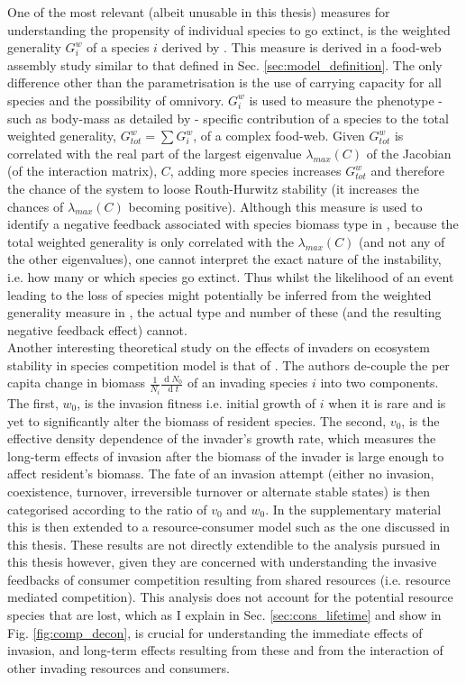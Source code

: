 \documentclass[a4paper]{report}
\DeclareMathOperator{\d}{d}
\begin{document}
 One of the most relevant (albeit unusable in this thesis) measures for understanding the propensity of individual species to go extinct, is the weighted generality $G^w_i$ of a species $i$ derived by \citep{Pawar2009}. This measure is derived in a food-web assembly study similar to that defined in Sec. \ref{sec:model_definition}. The only difference other than the parametrisation is the use of carrying capacity for all species and the possibility of omnivory. $G^w_i$ is used to measure the phenotype - such as body-mass as detailed by \citep{Pawar2015} - specific contribution of a species to the total weighted generality, $G^w_{tot}=\sum G^w_i$, of a complex food-web. Given $G^w_{tot}$ is correlated with the real part of the largest eigenvalue $\lambda_{max}(C)$ of the Jacobian (of the interaction matrix), $C$, adding more species increases $G^w_{tot}$ and therefore the chance of the system to loose Routh-Hurwitz stability (it increases the chances of $\lambda_{max}(C)$ becoming positive). Although this measure is used to identify a negative feedback associated with species biomass type in \citep{Pawar2015}, because the total weighted generality is only correlated with the $\lambda_{max}(C)$ (and not any of the other eigenvalues), one cannot interpret the exact nature of the instability, i.e. how many or which species go extinct. Thus whilst the likelihood of an event leading to the loss of species might potentially be inferred from the weighted generality measure in \citep{Pawar2009}, the actual type and number of these (and the resulting negative feedback effect) cannot. \\
 
 Another interesting theoretical study on the effects of invaders on ecosystem stability in species competition model is that of \citep{Barbier2019}. The authors de-couple the per capita change in biomass $\frac{1}{N_i}\frac{\d N_0}{\d t}$ of an invading species $i$ into two components. The first, $w_0$, is the invasion fitness i.e. initial growth of $i$ when it is rare and is yet to significantly alter the biomass of resident species. The second, $v_0$, is the effective density dependence of the invader’s growth rate, which measures the long-term effects of invasion after the biomass of the invader is large enough to affect resident's biomass. The fate of an invasion attempt (either no invasion, coexistence, turnover, irreversible turnover or alternate stable states) is then categorised according to the ratio of $v_0$ and $w_0$. In the supplementary material this is then extended to a resource-consumer model such as the one discussed in this thesis. These results are not directly extendible to the analysis pursued in this thesis however, given they are concerned with understanding the invasive feedbacks of consumer competition resulting from shared resources (i.e. resource mediated competition). This analysis does not account for the potential resource species that are lost, which as I explain in Sec. \ref{sec:cons_lifetime} and show in Fig. \ref{fig:comp_decon}, is crucial for understanding the immediate effects of invasion, and long-term effects resulting from these and from the interaction of other invading resources and consumers.\\
\end{document}
